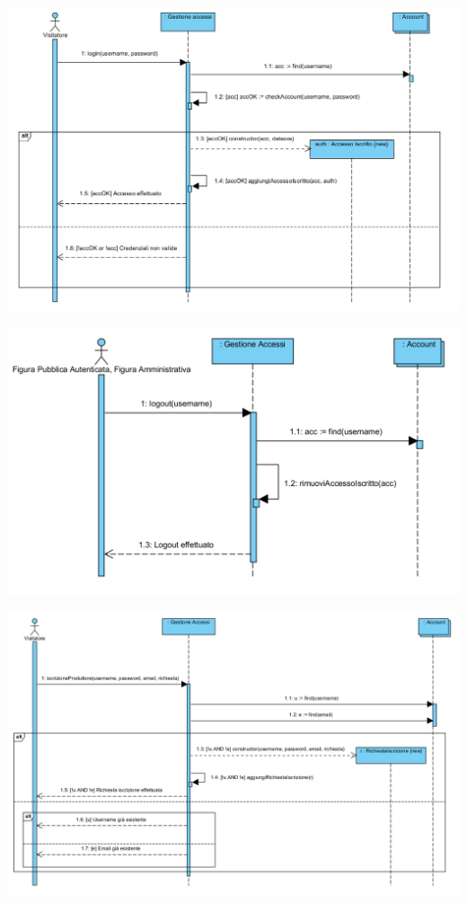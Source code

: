 \begin{center}
			\includegraphics[width=\textwidth]{assets/visualParadigm/sequenza/login}
\end{center}

\begin{center}
			\includegraphics[width=\textwidth]{assets/visualParadigm/sequenza/logout}
\end{center}

\begin{center}
			\includegraphics[width=\textwidth]{assets/visualParadigm/sequenza/iscrizioneProduttore}
\end{center}

